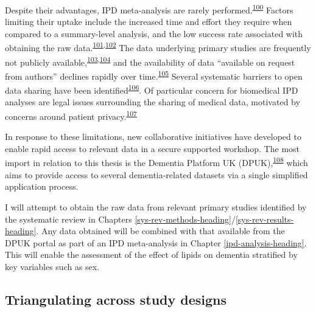\documentclass[a4paper, twoside]{templates/ociamthesis}
\begin{document}
Despite their advantages, IPD meta-analysis are rarely performed.\textsuperscript{\protect\hyperlink{ref-tugwell2010}{100}} Factors limiting their uptake include the increased time and effort they require when compared to a summary-level analysis, and the low success rate associated with obtaining the raw data.\textsuperscript{\protect\hyperlink{ref-nevitt2017}{101},\protect\hyperlink{ref-ventresca2020}{102}} The data underlying primary studies are frequently not publicly available,\textsuperscript{\protect\hyperlink{ref-alsheikh-ali2011}{103},\protect\hyperlink{ref-federer2018}{104}} and the availability of data ``available on request from authors'' declines rapidly over time.\textsuperscript{\protect\hyperlink{ref-vines2014}{105}} Several systematic barriers to open data sharing have been identified\textsuperscript{\protect\hyperlink{ref-vanpanhuis2014}{106}}. Of particular concern for biomedical IPD analyses are legal issues surrounding the sharing of medical data, motivated by concerns around patient privacy.\textsuperscript{\protect\hyperlink{ref-wartenberg2010}{107}}

In response to these limitations, new collaborative initiatives have developed to enable rapid access to relevant data in a secure supported workshop. The most import in relation to this thesis is the Dementia Platform UK (DPUK),\textsuperscript{\protect\hyperlink{ref-bauermeister2020}{108}} which aims to provide access to several dementia-related datasets via a single simplified application process.

I will attempt to obtain the raw data from relevant primary studies identified by the systematic review in Chapters \ref{sys-rev-methods-heading}/\ref{sys-rev-results-heading}. Any data obtained will be combined with that available from the DPUK portal as part of an IPD meta-analysis in Chapter \ref{ipd-analysis-heading}. This will enable the assessment of the effect of lipids on dementia stratified by key variables such as sex.

\hypertarget{intro-triangulation}{%
\subsection{Triangulating across study designs}\label{intro-triangulation}}
\end{document}
